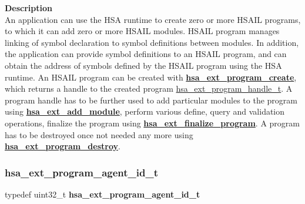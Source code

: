 \documentclass[final]{book}
\newcommand{\reffun}[1]{\textbf{#1}}
\newenvironment{mylongtable}{\rowcolors{0}{lightgray}{lightgray}\longtable} {
\endlongtable}
\begin{document}
\vspace{-4mm}\noindent\textbf{Description}\\[1mm]
An application can use the HSA runtime to create zero or more HSAIL programs, to which it can add zero or more HSAIL modules. HSAIL program manages linking of symbol declaration to symbol definitions between modules. In addition, the application can provide symbol definitions to an HSAIL program, and can obtain the address of symbols defined by the HSAIL program using the HSA runtime. An HSAIL program can be created with \hyperlink{group__linker_1gad67b0ec80bc0e9a18336a68cf741b6e8}{\reffun{hsa_\-ext_\-program_\-create}}, which returns a handle to the created program \hyperlink{group__linker_1gaea8d90863414407ddba7e318db7412f9}{hsa_\-ext_\-program_\-handle_\-t}. A program handle has to be further used to add particular modules to the program using \hyperlink{group__linker_1gaf8d506d1fbdb2cde2392478ea344ca87}{\reffun{hsa_\-ext_\-add_\-module}}, perform various define, query and validation operations, finalize the program using \hyperlink{group__linker_1ga0c592594fa988c24b661146f79120399}{\reffun{hsa_\-ext_\-finalize_\-program}}. A program has to be destroyed once not needed any more using \hyperlink{group__linker_1gad52eaf70ef7263cf188747e64553643f}{\reffun{hsa_\-ext_\-program_\-destroy}}. 


\subsubsection{hsa_\-ext_\-program_\-agent_\-id_\-t}
\vspace{-5.5mm}\begin{mylongtable}{@{}p{\textwidth}}
\rule{0pt}{3ex}\rule[-2.5ex]{0pt}{0pt}typedef uint32_\-t  \hypertarget{group__linker_1gae5495f2eba536530c9dd422c93ae2028}{\textbf{hsa_\-ext_\-program_\-agent_\-id_\-t}}
\end{mylongtable}\vspace{-3mm}
\vspace{-2mm}
\end{document}
